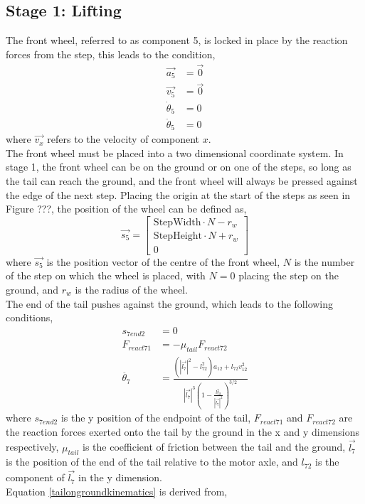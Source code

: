 \subsection*{Stage 1: Lifting}
The front wheel, referred to as component 5, is locked in place by the reaction forces from the step, this leads to the condition,
\begin{subequations}
	\label{wheel1locked}
	\begin{align}
		\vec{a_5} &= \vec{0}\\
		\vec{v_5} &= \vec{0}\\
		\dot{\theta}_5 &= 0\\
		\ddot{\theta}_5 &= 0
	\end{align}
\end{subequations}
where $\vec{v_x}$ refers to the velocity of component $x$.\\
The front wheel must be placed into a two dimensional coordinate system. In stage 1, the front wheel can be on the ground or on one of the steps, so long as the tail can reach the ground, and the front wheel will always be pressed against the edge of the next step. Placing the origin at the start of the steps as seen in Figure ???, the position of the wheel can be defined as,
\begin{equation}
	\vec{s_5}
	=
	\begin{bmatrix}
		\mathrm{StepWidth}\cdot N-r_w\\
		\mathrm{StepHeight}\cdot N+r_w\\
		0
	\end{bmatrix}
\end{equation}
where $\vec{s_5}$ is the position vector of the centre of the front wheel, $N$ is the number of the step on which the wheel is placed, with $N = 0$ placing the step on the ground, and $r_w$ is the radius of the wheel.\\
The end of the tail pushes against the ground, which leads to the following conditions,
\begin{subequations}
	\label{tailonground}
	\begin{align}
		s_{7end2} &= 0\\
		F_{react71} &=  -\mu_{tail}F_{react72}\\
		\ddot{\theta_7} &= \frac{(|\vec{l_7}|^2 - l_{72}^2)a_{12} + l_{72}v_{12}^2}{|\vec{l_7}|^3 (1 - \frac{l_{72}^2}{|\vec{l_7}|^2})^{3/2}} \label{tailongroundkinematics}
	\end{align}
\end{subequations}
where $s_{7end2}$ is the y position of the endpoint of the tail, $F_{react71}$ and $F_{react72}$ are the reaction forces exerted onto the tail by the ground in the x and y dimensions respectively, $\mu_{tail}$ is the coefficient of friction between the tail and the ground, $\vec{l_7}$ is the position of the end of the tail relative to the motor axle, and $l_{72}$ is the component of $\vec{l_7}$ in the y dimension. \\
Equation \ref{tailongroundkinematics} is derived from,

